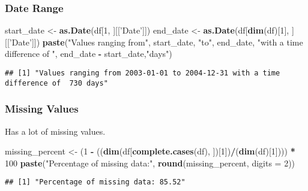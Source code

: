 \documentclass[
]{article}
\newenvironment{Shaded}{\begin{snugshade}}{\end{snugshade}}
\newcommand{\DataTypeTok}[1]{\textcolor[rgb]{0.13,0.29,0.53}{#1}}
\newcommand{\DecValTok}[1]{\textcolor[rgb]{0.00,0.00,0.81}{#1}}
\newcommand{\KeywordTok}[1]{\textcolor[rgb]{0.13,0.29,0.53}{\textbf{#1}}}
\newcommand{\NormalTok}[1]{#1}
\newcommand{\OperatorTok}[1]{\textcolor[rgb]{0.81,0.36,0.00}{\textbf{#1}}}
\newcommand{\StringTok}[1]{\textcolor[rgb]{0.31,0.60,0.02}{#1}}
\begin{document}
\hypertarget{date-range}{%
\subsubsection{Date Range}\label{date-range}}

\begin{Shaded}
\begin{Highlighting}[]
\NormalTok{start_date <-}\StringTok{ }\KeywordTok{as.Date}\NormalTok{(df[}\DecValTok{1}\NormalTok{, ][[}\StringTok{'Date'}\NormalTok{]])}
\NormalTok{end_date <-}\StringTok{ }\KeywordTok{as.Date}\NormalTok{(df[}\KeywordTok{dim}\NormalTok{(df)[}\DecValTok{1}\NormalTok{], ][[}\StringTok{'Date'}\NormalTok{]])}
\KeywordTok{paste}\NormalTok{(}\StringTok{"Values ranging from"}\NormalTok{, start_date, }\StringTok{"to"}\NormalTok{, end_date, }\StringTok{"with a time difference of "}\NormalTok{, end_date }\OperatorTok{-}\StringTok{ }\NormalTok{start_date,}\StringTok{"days"}\NormalTok{)}
\end{Highlighting}
\end{Shaded}

\begin{verbatim}
## [1] "Values ranging from 2003-01-01 to 2004-12-31 with a time difference of  730 days"
\end{verbatim}

\hypertarget{missing-values}{%
\subsubsection{Missing Values}\label{missing-values}}

Has a lot of missing values.

\begin{Shaded}
\begin{Highlighting}[]
\NormalTok{missing_percent <-}\StringTok{ }\NormalTok{(}\DecValTok{1} \OperatorTok{-}\StringTok{ }\NormalTok{((}\KeywordTok{dim}\NormalTok{(df[}\KeywordTok{complete.cases}\NormalTok{(df), ])[}\DecValTok{1}\NormalTok{])}\OperatorTok{/}\NormalTok{(}\KeywordTok{dim}\NormalTok{(df)[}\DecValTok{1}\NormalTok{]))) }\OperatorTok{*}\StringTok{ }\DecValTok{100}
\KeywordTok{paste}\NormalTok{(}\StringTok{"Percentage of missing data:"}\NormalTok{, }\KeywordTok{round}\NormalTok{(missing_percent, }\DataTypeTok{digits =} \DecValTok{2}\NormalTok{))}
\end{Highlighting}
\end{Shaded}

\begin{verbatim}
## [1] "Percentage of missing data: 85.52"
\end{verbatim}
\end{document}
